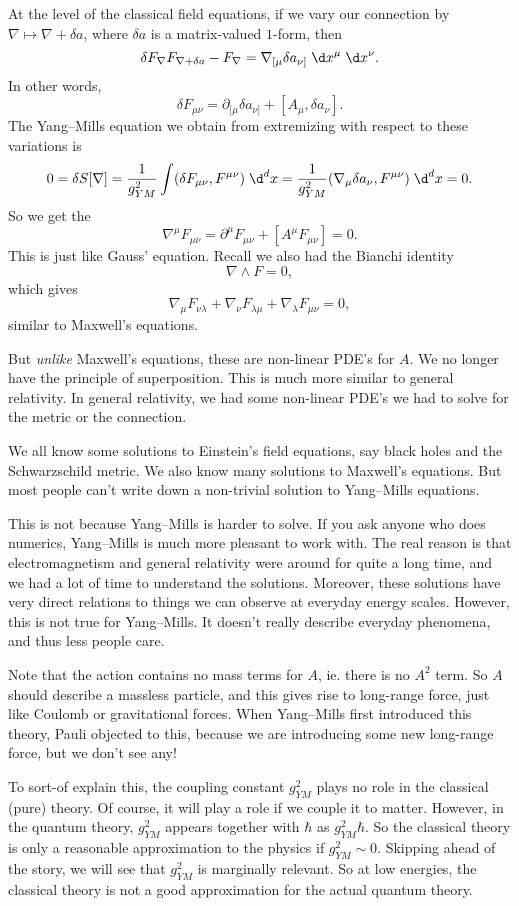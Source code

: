 \documentclass[a4paper]{article}
\begin{document}
At the level of the classical field equations, if we vary our connection by $\nabla \mapsto \nabla + \delta a$, where $\delta a$ is a matrix-valued $1$-form, then
\[
  \delta F_\nabla F_{\nabla + \delta a} - F_{\nabla} = \nabla_{[\mu} \delta a_{\nu]}\;\d x^\mu\; \d x^\nu.
\]
In other words,
\[
  \delta F_{\mu\nu} = \partial_{[\mu} \delta a_{\nu]} + [A_\mu, \delta a_\nu].
\]
The Yang--Mills equation we obtain from extremizing with respect to these variations is
\[
  0 = \delta S[\nabla] = \frac{1}{g_{YM}^2} \int (\delta F_{\mu\nu}, F^{\mu\nu}) \;\d^d x = \frac{1}{g_{YM}^2} (\nabla_\mu \delta a_\nu, F^{\mu\nu})\;\d^d x = 0.
\]
So we get the 
\[
  \nabla^\mu F_{\mu\nu} = \partial^\mu F_{\mu\nu} + [A^\mu F_{\mu\nu}] = 0.
\]
This is just like Gauss' equation. Recall we also had the Bianchi identity
\[
  \nabla \wedge F = 0,
\]
which gives
\[
  \nabla_\mu F_{\nu\lambda} + \nabla_\nu F_{\lambda\mu} + \nabla_\lambda F_{\mu\nu} = 0,
\]
similar to Maxwell's equations.

But \emph{unlike} Maxwell's equations, these are non-linear PDE's for $A$. We no longer have the principle of superposition. This is much more similar to general relativity. In general relativity, we had some non-linear PDE's we had to solve for the metric or the connection.

We all know some solutions to Einstein's field equations, say black holes and the Schwarzschild metric. We also know many solutions to Maxwell's equations. But most people can't write down a non-trivial solution to Yang--Mills equations.

This is not because Yang--Mills is harder to solve. If you ask anyone who does numerics, Yang--Mills is much more pleasant to work with. The real reason is that electromagnetism and general relativity were around for quite a long time, and we had a lot of time to understand the solutions. Moreover, these solutions have very direct relations to things we can observe at everyday energy scales. However, this is not true for Yang--Mills. It doesn't really describe everyday phenomena, and thus less people care.

Note that the action contains no mass terms for $A$, ie. there is no $A^2$ term. So $A$ should describe a massless particle, and this gives rise to long-range force, just like Coulomb or gravitational forces. When Yang--Mills first introduced this theory, Pauli objected to this, because we are introducing some new long-range force, but we don't see any!

To sort-of explain this, the coupling constant $g^2_{YM}$ plays no role in the classical (pure) theory. Of course, it will play a role if we couple it to matter. However, in the quantum theory, $g^2_{YM}$ appears together with $\hbar$ as $g^2_{YM} \hbar$. So the classical theory is only a reasonable approximation to the physics if $g^2_{YM} \sim 0$. Skipping ahead of the story, we will see that $g^2_{YM}$ is marginally relevant. So at low energies, the classical theory is not a good approximation for the actual quantum theory.
\end{document}
